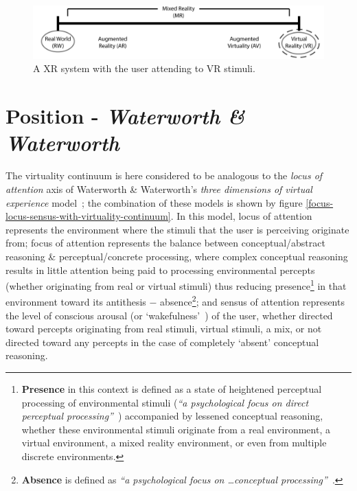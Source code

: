 \documentclass[oneside]{book}
\begin{document}
\begin{figure}[h]
	\begin{center}
		\includegraphics[width=\textwidth]{images/virtuality-continuum-cross-reality-3.png}
		\caption{A XR system with the user attending to VR stimuli.}
		\label{virtuality-continuum-cross-reality-3}
	\end{center}
\end{figure}

\clearpage


\section{Position - \textit{Waterworth \& Waterworth}}
\label{waterworth}
\newcommand{\presencefootnote}{\footnote{\textbf{Presence} in this context is defined as a state of heightened perceptual processing of environmental stimuli (\textit{``a psychological focus on direct perceptual processing''}~\cite{Waterworth2001}) accompanied by lessened conceptual reasoning, whether these environmental stimuli originate from a real environment, a virtual environment, a mixed reality environment, or even from multiple discrete environments.}}

\newcommand{\absencefootnote}{\footnote{\textbf{Absence} is defined as \textit{``a psychological focus on \ldots conceptual processing''}~\cite{Waterworth2001}.}}

The virtuality continuum is here considered to be analogous to the \textit{locus of attention} axis of Waterworth \& Waterworth's \textit{three dimensions of virtual experience} model~\cite{Waterworth2001}; the combination of these models is shown by figure \ref{focus-locus-sensus-with-virtuality-continuum}. In this model, locus of attention represents the environment where the stimuli that the user is perceiving originate from; focus of attention represents the balance between conceptual/abstract reasoning \& perceptual/concrete processing, where complex conceptual reasoning results in little attention being paid to processing environmental percepts (whether originating from real or virtual stimuli) thus reducing presence\presencefootnote{} in that environment toward its antithesis $-$ absence\absencefootnote{}; and sensus of attention represents the level of conscious arousal (or `wakefulness'~\cite{Laureys2009}) of the user, whether directed toward percepts originating from real stimuli, virtual stimuli, a mix, or not directed toward any percepts in the case of completely `absent' conceptual reasoning.
\end{document}
